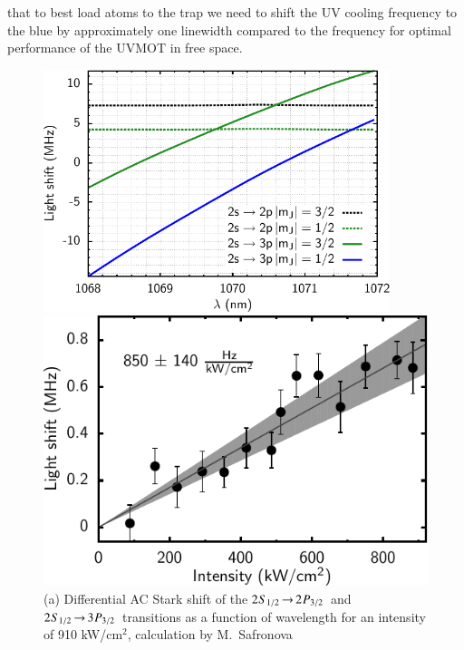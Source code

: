 \documentclass[oneside,12pt]{memoir}
\newcommand{\twos}[1]{\ensuremath{\hspace{-1pt}2\hspace{0.5pt}\hspace{0pt}S_{#1}\hspace{-1pt}}}
\newcommand{\twop}[1]{\ensuremath{\hspace{-1pt}2\hspace{0.5pt}\hspace{0pt}P_{#1}\hspace{-1pt}}}
\newcommand{\trep}[1]{\ensuremath{\hspace{-1pt}3\hspace{0.5pt}\hspace{0pt}P_{#1}\hspace{-1pt}}}
\newcommand{\red}{\ensuremath{ \twos{1/2}\hspace{-0.0pt}\rightarrow\hspace{-0.0pt}\twop{3/2} }\ }
\newcommand{\uv}{\ensuremath{ \twos{1/2}\hspace{-0.0pt}\rightarrow\hspace{-0.0pt}\trep{3/2} }\ }
\begin{document}
that to best load atoms to the trap we need to shift the UV cooling frequency
to the blue by approximately one linewidth compared to the frequency for
optimal performance of the UVMOT in free space.  \begin{figure}
\begin{minipage}{0.5\linewidth} \centering
\includegraphics[width=0.9\textwidth]{../figures/safronova/diffpoleps.pdf}
\end{minipage} \begin{minipage}{0.5\linewidth} \centering
\includegraphics[width=\textwidth]{../figures/lightshift/lightshifteps.pdf}
\end{minipage} \caption[Differential AC Stark shift for 1070 nm light]{\small
(a) Differential AC Stark shift of the \red and \uv transitions as a function
of wavelength for an intensity of 910 kW/cm$^{2}$, calculation by M.~Safronova
}
\end{figure}
\end{document}
